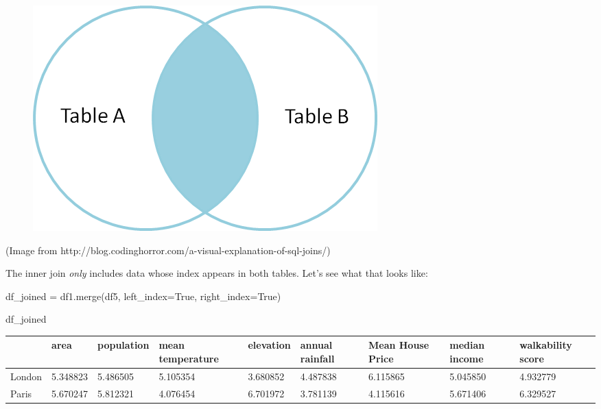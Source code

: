\documentclass[
  letterpaper,
  DIV=11,
  numbers=noendperiod]{scrreprt}
\newenvironment{Shaded}{\begin{snugshade}}{\end{snugshade}}
\newcommand{\NormalTok}[1]{\textcolor[rgb]{0.00,0.23,0.31}{#1}}
\newcommand{\OperatorTok}[1]{\textcolor[rgb]{0.37,0.37,0.37}{#1}}
\newcommand{\VariableTok}[1]{\textcolor[rgb]{0.07,0.07,0.07}{#1}}
\begin{document}
\begin{figure}[H]

{\centering \includegraphics{notebooks/W05. Merging and Joining_files/figure-pdf/cell-33-output-1.png}

}

\end{figure}

(Image from
http://blog.codinghorror.com/a-visual-explanation-of-sql-joins/)

The inner join \emph{only} includes data whose index appears in both
tables. Let's see what that looks like:

\begin{Shaded}
\begin{Highlighting}[]
\NormalTok{df\_joined }\OperatorTok{=}\NormalTok{ df1.merge(df5, left\_index}\OperatorTok{=}\VariableTok{True}\NormalTok{, right\_index}\OperatorTok{=}\VariableTok{True}\NormalTok{)}
\end{Highlighting}
\end{Shaded}

\begin{Shaded}
\begin{Highlighting}[]
\NormalTok{df\_joined}
\end{Highlighting}
\end{Shaded}

\begin{longtable}[]{@{}lllllllll@{}}
\toprule()
& area & population & mean temperature & elevation & annual rainfall &
Mean House Price & median income & walkability score \\
\midrule()
\endhead
London & 5.348823 & 5.486505 & 5.105354 & 3.680852 & 4.487838 & 6.115865
& 5.045850 & 4.932779 \\
Paris & 5.670247 & 5.812321 & 4.076454 & 6.701972 & 3.781139 & 4.115616
& 5.671406 & 6.329527 \\
\bottomrule()
\end{longtable}
\end{document}
